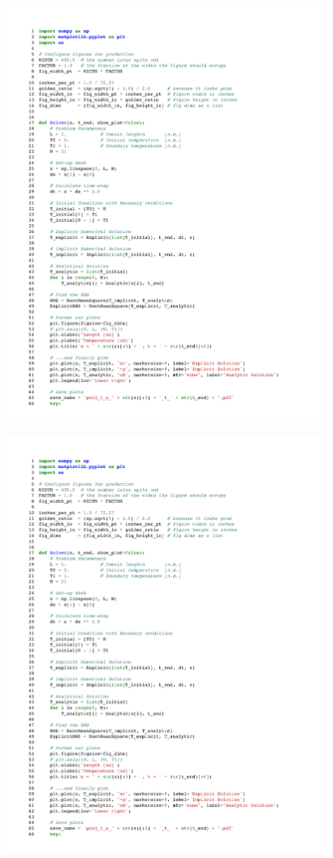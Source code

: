 \documentclass[twocolumn,10pt]{asme2ej}
\begin{document}
\begin{figure}[htb]
\begin{center}
\includegraphics[page=3,width=0.93\textwidth]{../Karasinski - Case Study 1.pdf}
\end{center}
\end{figure}

\begin{figure}[htb]
\begin{center}
\includegraphics[page=4,width=0.93\textwidth]{../Karasinski - Case Study 1.pdf}
\end{center}
\end{figure}
\end{document}

